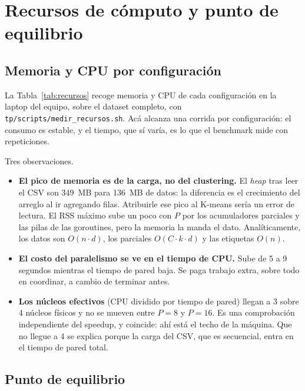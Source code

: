 \section{Recursos de cómputo y punto de equilibrio}\label{sec:recursos}

\subsection{Memoria y CPU por configuración}

La Tabla~\ref{tab:recursos} recoge memoria y CPU de cada configuración en la laptop del equipo,
sobre el dataset completo, con \texttt{tp/scripts/medir\_recursos.sh}. Acá alcanza una corrida por
configuración: el consumo es estable, y el tiempo, que sí varía, es lo que el benchmark mide con
repeticiones.



Tres observaciones.

\begin{itemize}
  \item \textbf{El pico de memoria es de la carga, no del clustering.} El \emph{heap} tras leer el
        CSV son 349~MB para 136~MB de datos: la diferencia es el crecimiento del arreglo al ir
        agregando filas. Atribuirle ese pico al K-means sería un error de lectura. El RSS máximo
        sube un poco con $P$ por los acumuladores parciales y las pilas de las goroutines, pero la
        memoria la manda el dato. Analíticamente, los datos son $O(n \cdot d)$, los parciales
        $O(C \cdot k \cdot d)$ y las etiquetas $O(n)$.
  \item \textbf{El costo del paralelismo se ve en el tiempo de CPU.} Sube de 5 a 9 segundos mientras
        el tiempo de pared baja. Se paga trabajo extra, sobre todo en coordinar, a cambio de
        terminar antes.
  \item \textbf{Los núcleos efectivos} (CPU dividido por tiempo de pared) llegan a 3 sobre 4 núcleos
        físicos y no se mueven entre $P = 8$ y $P = 16$. Es una comprobación independiente del
        speedup, y coincide: ahí está el techo de la máquina. Que no llegue a 4 se explica porque la
        carga del CSV, que es secuencial, entra en el tiempo de pared total.
\end{itemize}

\subsection{Punto de equilibrio}\label{sec:equilibrio}


